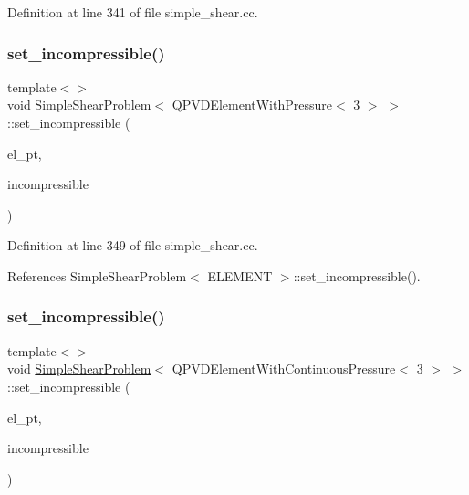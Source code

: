 Definition at line 341 of file simple\+\_\+shear.\+cc.

\mbox{\label{classSimpleShearProblem_a064e94ff77e20bc81cd4ddbec58f26aa}} 
\subsubsection{\texorpdfstring{set\+\_\+incompressible()}{set\_incompressible()}\hspace{0.1cm}{\footnotesize\ttfamily [4/7]}}
{\footnotesize\ttfamily template$<$$>$ \\
void \hyperlink{classSimpleShearProblem}{Simple\+Shear\+Problem}$<$ Q\+P\+V\+D\+Element\+With\+Pressure$<$ 3 $>$ $>$\+::set\+\_\+incompressible (\begin{DoxyParamCaption}\item[{Q\+P\+V\+D\+Element\+With\+Pressure$<$ 3 $>$ $\ast$}]{el\+\_\+pt,  }\item[{const bool \&}]{incompressible }\end{DoxyParamCaption})\hspace{0.3cm}{\ttfamily [private]}}



Definition at line 349 of file simple\+\_\+shear.\+cc.



References Simple\+Shear\+Problem$<$ E\+L\+E\+M\+E\+N\+T $>$\+::set\+\_\+incompressible().

\mbox{\label{classSimpleShearProblem_a4f91c840813899e3977937e01e3bbb1e}} 
\subsubsection{\texorpdfstring{set\+\_\+incompressible()}{set\_incompressible()}\hspace{0.1cm}{\footnotesize\ttfamily [5/7]}}
{\footnotesize\ttfamily template$<$$>$ \\
void \hyperlink{classSimpleShearProblem}{Simple\+Shear\+Problem}$<$ Q\+P\+V\+D\+Element\+With\+Continuous\+Pressure$<$ 3 $>$ $>$\+::set\+\_\+incompressible (\begin{DoxyParamCaption}\item[{Q\+P\+V\+D\+Element\+With\+Continuous\+Pressure$<$ 3 $>$ $\ast$}]{el\+\_\+pt,  }\item[{const bool \&}]{incompressible }\end{DoxyParamCaption})\hspace{0.3cm}{\ttfamily [private]}}



